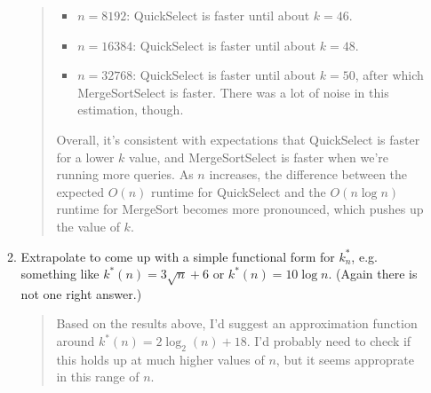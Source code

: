 \documentclass[11pt]{article}
\begin{document}
\begin{enumerate}
\begin{enumerate}
\begin{quote}
\begin{itemize}
               \item $n = 8192$: QuickSelect is faster until about $k = 46$.
               \item $n = 16384$: QuickSelect is faster until about $k = 48$.
               \item $n = 32768$: QuickSelect is faster until about $k = 50$, after which MergeSortSelect is faster. There was a lot of noise in this estimation, though.
           \end{itemize}
           \vspace{1em}
           Overall, it's consistent with expectations that QuickSelect is faster for a lower $k$ value, and MergeSortSelect is faster when we're running more queries. As $n$ increases, the difference between the expected $O(n)$ runtime for QuickSelect and the $O(n \log n)$ runtime for MergeSort becomes more pronounced, which pushes up the value of $k$.
           
        \end{quote}

        \item Extrapolate to come up with a simple functional form for $k^*_n$, e.g. something like $k^*(n)=3\sqrt{n}+6$ or $k^*(n)=10\log n$. (Again there is not one right answer.)

        \begin{quote}
            \color{purple}
            Based on the results above, I'd suggest an approximation function around $k^*(n) = 2 \log_2 (n) + 18$. I'd probably need to check if this holds up at much higher values of $n$, but it seems approprate in this range of $n$.
        \end{quote}


\end{enumerate}
\end{enumerate}
\end{document}
